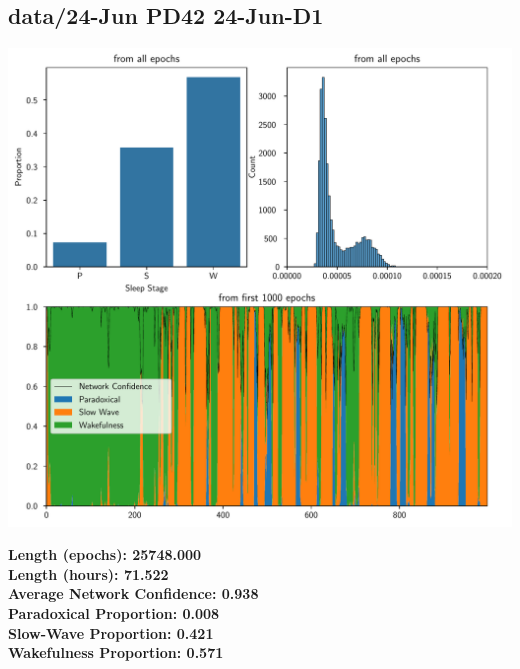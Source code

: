         \subsection*{ data/24-Jun PD42 24-Jun-D1 }
        \begin{center}
        \begin{adjustbox}{width=1\textwidth}
        \includegraphics[page=26]{figs.pdf}
        \end{adjustbox}
        \end{center}
        \large\textbf{Length (epochs): 25748.000}\\
        \textbf{Length (hours): 71.522}\\
        \textbf{Average Network Confidence: 0.938}\\
        \textbf{Paradoxical Proportion: 0.008}\\
        \textbf{Slow-Wave Proportion: 0.421}\\
        \textbf{Wakefulness Proportion: 0.571}\\
        

